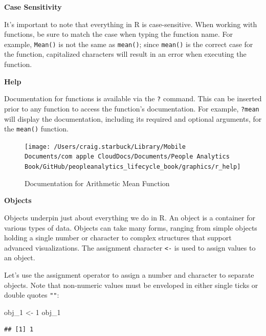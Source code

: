 \documentclass[]{book}
\newenvironment{Shaded}{\begin{snugshade}}{\end{snugshade}}
\newcommand{\DecValTok}[1]{\textcolor[rgb]{0.00,0.00,0.81}{#1}}
\newcommand{\NormalTok}[1]{#1}
\newcommand{\StringTok}[1]{\textcolor[rgb]{0.31,0.60,0.02}{#1}}
\begin{document}
\textbf{Case Sensitivity}

It's important to note that everything in R is case-sensitive. When working with functions, be sure to match the case when typing the function name. For example, \texttt{Mean()} is not the same as \texttt{mean()}; since \texttt{mean()} is the correct case for the function, capitalized characters will result in an error when executing the function.

\textbf{Help}

Documentation for functions is available via the \texttt{?} command. This can be inserted prior to any function to access the function's documentation. For example, \texttt{?mean} will display the documentation, including its required and optional arguments, for the \texttt{mean()} function.

\begin{figure}

{\centering \texttt{[image: /Users/craig.starbuck/Library/Mobile Documents/com~apple~CloudDocs/Documents/People Analytics Book/GitHub/peopleanalytics\_lifecycle\_book/graphics/r\_help]} 

}

\caption{Documentation for Arithmetic Mean Function}\label{fig:r-help}
\end{figure}

\textbf{Objects}

Objects underpin just about everything we do in R. An object is a container for various types of data. Objects can take many forms, ranging from simple objects holding a single number or character to complex structures that support advanced visualizations. The assignment character \texttt{\textless{}-} is used to assign values to an object.

Let's use the assignment operator to assign a number and character to separate objects. Note that non-numeric values must be enveloped in either single ticks \texttt{\textquotesingle{}\textquotesingle{}} or double quotes \texttt{""}:

\begin{Shaded}
\begin{Highlighting}[]
\NormalTok{obj_}\DecValTok{1}\NormalTok{ <-}\StringTok{ }\DecValTok{1}
\NormalTok{obj_}\DecValTok{1}
\end{Highlighting}
\end{Shaded}

\begin{verbatim}
## [1] 1
\end{verbatim}
\end{document}
